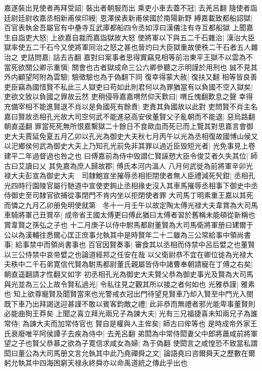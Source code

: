 嘉遂裝出見使者再拜受詔|{
	裝出者朝服而出}
乘吏小車去蓋不冠|{
	去羌呂翻}
隨使者詣廷尉廷尉收嘉丞相新甫侯印綬|{
	恩澤侯表新甫侯國於南陽新野}
縛嘉載致都船詔獄|{
	百官表執金吾屬官有中壘寺互武庫都船四令丞如淳曰漢儀注有寺互都船獄}
上聞嘉生自詣吏大怒|{
	上欲嘉自裁而嘉詣獄故大怒}
使將軍以下與五二千石雜治|{
	漢治大臣獄率使五二千石今又使將軍同治之怒之甚也晉灼曰大臣獄重故使秩二干石者五人雜治之}
吏詰問嘉|{
	詰去吉翻}
嘉對曰案事者思得實竊見相等前治東平王獄不以雲為不當死欲關公卿示重愼|{
	關會也古者獄成命三公六卿參聽之示明謹於用刑也}
誠不見其外内顧望阿附為雲驗|{
	驗徵驗也為于偽翻下同}
復幸得蒙大赦|{
	復扶又翻}
相等皆良善吏臣竊為國惜賢不私此三人獄吏曰苟如此則君何以為罪猶當有以負國不空入獄矣|{
	吏欲文致以負國之罪故云然}
吏稍侵辱嘉嘉喟然仰天歎曰|{
	喟丘愧翻歎息之聲}
幸得充備宰相不能進賢退不肖以是負國死有餘責|{
	吏責其負國故以此對}
吏問賢不肖主名嘉曰賢故丞相孔光故大司空何武不能進惡高安侯董賢父子亂朝而不能退|{
	惡烏路翻朝直遥翻}
罪當死死無所恨嘉繫獄二十餘日不食歐血而死已而上覽其對思嘉言會御史大夫賈延免夏五月乙卯以孔光為御史大夫秋七月丙午以光為丞相復故國博山侯又以汜鄉侯何武為御史大夫上乃知孔光前免非其罪以過近臣毁短光者|{
	光免事見上卷建平二年過督過也咎之也}
曰傅嘉前為侍中毁譛仁賢誣愬大臣令俊艾者久失其位|{
	師古曰艾讀曰乂}
其免嘉為庶人歸故郡|{
	傅氏本河内溫人}
八月何武徙為前將軍辛卯光禄大夫彭宣為御史大夫　司隸鮑宣坐摧辱丞相拒閉使者無人臣禮減死髠鉗|{
	丞相孔光四時行園陵官屬行馳道中宣使吏銁止丞相掾史沒入其車馬摧辱丞相事下御史中丞侍御史至司隸官欲捕從事閉門不肯内坐以拒閉使者罪}
大司馬丁明素重王嘉以其死而憐之九月乙卯册免明使就第　冬十一月壬午以故定陶太傅光禄大夫韋賞為大司馬車騎將軍己丑賞卒|{
	成帝省王國太傅更曰傅此猶曰太傅者習於舊稱未能頓從新稱也賞韋賢之孫弘之子也}
十二月庚子以侍中駙馬都尉董賢為大司馬衛將軍册曰建爾于公以為漢輔往悉爾心匡正庶事允執其中是時賢年二十二雖為三公常給事中領尚書事|{
	給事禁中而領尚書事也}
百官因賢奏事|{
	審食其以丞相而侍禁中呂后嬖之也董賢以三公侍禁中哀帝嬖之也論道經邦之任安在哉}
以父衛尉恭不宜在卿位徙為光禄大夫秩中二千石弟寛信代賢為駙馬都尉董氏親屬皆侍中諸曹奉朝請寵在丁傅之右矣|{
	朝直遥翻請才性翻又如字}
初丞相孔光為御史大夫賢父恭為御史事光及賢為大司馬與光並為三公上故令賢私過光|{
	令私往見之觀其所以接之者何如也}
光雅恭謹|{
	雅素也}
知上欲尊寵賢及聞賢當來也光警戒衣冠出門待望見賢車乃却入賢至中門光入閤既下車乃出拜謁送迎甚謹不敢以賓客鈞敵之禮|{
	此非恭而無禮者邪光能卑事董賢則必能曲狥王莽矣}
上聞之喜立拜光兩兄子為諫大夫|{
	光有三兄福捷喜未知兩兄子為誰}
常侍|{
	為諫大夫而加常侍官也}
賢自是權與人主侔矣|{
	師古曰侔等也}
是時成帝外家王氏衰廢唯平阿侯譚子去疾為侍中|{
	去羌呂翻}
弟閎為中常侍閎妻父中郎將蕭咸前將軍望之子也賢父恭慕之欲為子寛信求咸女為婦|{
	為于偽翻}
使閎言之咸惶恐不致當私謂閎曰董公為大司馬册文言允執其中此乃堯禪舜之文|{
	論語堯曰咨爾舜天之歷數在爾躬允執其中四海困窮天禄永終舜亦以命禹道統之傳此乎出也}
